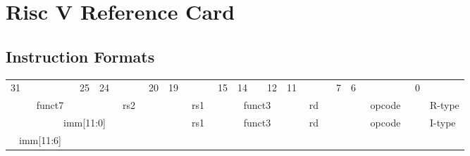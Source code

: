 \vspace*{-2cm}
    
\section*{Risc V Reference Card}\label{InstructionCard}

\subsection*{Instruction Formats}
    \begin{table}[h]
        \scriptsize
        \begin{tabular} %
            {p{0.01mm}p{0.01mm}p{0.01mm}p{0.01mm} p{0.01mm}p{0.01mm}p{0.01mm}p{0.01mm}
             p{0.01mm}p{0.01mm}p{0.01mm}p{0.01mm} p{0.01mm}p{0.01mm}p{0.01mm}p{0.01mm}
             p{0.01mm}p{0.01mm}p{0.01mm}p{0.01mm} p{0.01mm}p{0.01mm}p{0.01mm}p{0.01mm}
             p{0.01mm}p{0.01mm}p{0.01mm}p{0.01mm} p{0.01mm}p{0.01mm}p{0.01mm}p{0.01mm} l}
            \multicolumn{1}{c}{31}&&&&&&
            \multicolumn{1}{c}{25}&
            \multicolumn{1}{c}{24}&&&&
            \multicolumn{1}{c}{20}&
            \multicolumn{1}{c}{19}&&&&
            \multicolumn{1}{c}{15}&
            \multicolumn{1}{c}{14}&&
            \multicolumn{1}{c}{12}&
            \multicolumn{1}{c}{11}&&&&
            \multicolumn{1}{c}{7}&
            \multicolumn{1}{c}{6}&&&&&&
            \multicolumn{1}{c}{0}&
            \\
            \cline{0-31} 
            \multicolumn{7}{|c|}{funct7} &
            \multicolumn{5}{c|}{rs2}&
            \multicolumn{5}{c|}{rs1}&
            \multicolumn{3}{c|}{funct3}&
            \multicolumn{5}{c|}{rd}&
            \multicolumn{7}{c|}{opcode}&
            R-type
            \\
            \cline{0-31} 
            \multicolumn{12}{|c|}{imm[11:0]} &
            \multicolumn{5}{c|}{rs1}&
            \multicolumn{3}{c|}{funct3}&
            \multicolumn{5}{c|}{rd}&
            \multicolumn{7}{c|}{opcode}&
            I-type
            \\
            \cline{0-31} 
            \multicolumn{6}{|c|}{imm[11:6]} &

\end{tabular}
\end{table}
